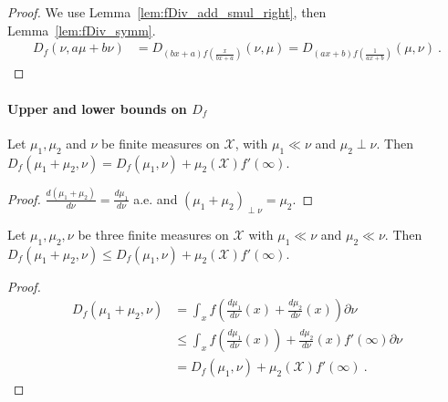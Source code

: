 \begin{proof}\leanok
{}
We use Lemma~\ref{lem:fDiv_add_smul_right}, then Lemma~\ref{lem:fDiv_symm}.
\begin{align*}
D_f(\nu, a \mu + b \nu)
&= D_{(bx+a)f\left(\frac{x}{bx+a}\right)}(\nu, \mu)
= D_{(ax+b)f\left(\frac{1}{ax+b}\right)}(\mu, \nu)
\: .
\end{align*}
\end{proof}



\paragraph{Upper and lower bounds on $D_f$}

\begin{lemma}
  \label{lem:fDiv_absolutelyContinuous_add_mutuallySingular}
  \leanok
  Let $\mu_1, \mu_2$ and $\nu$ be finite measures on $\mathcal X$, with $\mu_1 \ll \nu$ and $\mu_2 \perp \nu$.
  Then $D_f(\mu_1 + \mu_2, \nu) = D_f(\mu_1, \nu) + \mu_2(\mathcal X) f'(\infty)$.
\end{lemma}

\begin{proof}\leanok
$\frac{d(\mu_1 + \mu_2)}{d \nu} = \frac{d \mu_1}{d \nu}$ a.e. and $(\mu_1 + \mu_2)_{\perp \nu} = \mu_2$.
\end{proof}


\begin{lemma}
  \label{lem:fDiv_add_measure_le_of_ac}
  \leanok
  Let $\mu_1, \mu_2, \nu$ be three finite measures on $\mathcal X$ with $\mu_1 \ll \nu$ and $\mu_2 \ll \nu$. Then
  $D_f(\mu_1 + \mu_2, \nu) \le D_f(\mu_1, \nu) + \mu_2(\mathcal X) f'(\infty)$.
\end{lemma}

\begin{proof}\leanok
\begin{align*}
D_f(\mu_1 + \mu_2, \nu)
&= \int_x f \left( \frac{d \mu_1}{d\nu}(x) + \frac{d\mu_2}{d\nu}(x) \right) \partial \nu
\\
&\le \int_x f \left( \frac{d \mu_1}{d\nu}(x) \right) + \frac{d\mu_2}{d\nu}(x) f'(\infty) \partial \nu
\\
&= D_f(\mu_1, \nu) + \mu_2(\mathcal X) f'(\infty)
\: .
\end{align*}
\end{proof}


